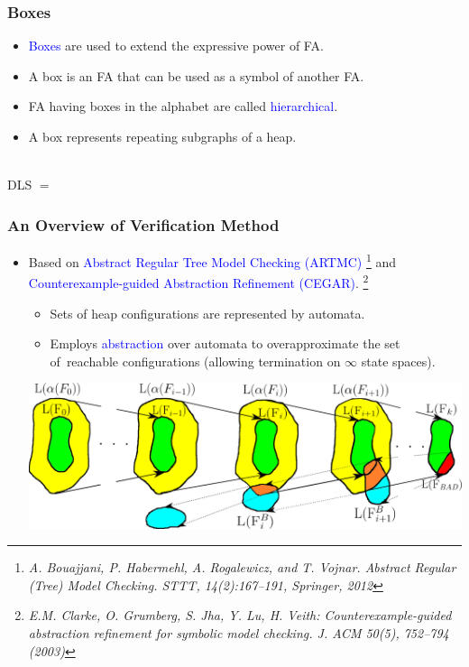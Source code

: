 \documentclass{beamer}
\newcommand{\hlbl}[1]{\textcolor{blue}{#1}}
\begin{document}
 
\begin{frame}
\frametitle{Boxes}

\begin{itemize}
		\item \hlbl{Boxes} are used to extend the expressive power of FA.
		\item A box is an FA that can be used as a symbol of another FA.
		\item FA having boxes in the alphabet are called \hlbl{hierarchical}.
		\item A box represents repeating subgraphs of a heap.
	\end{itemize}
		\vspace{-0.8cm}
		\centering \\
		\vspace{0.7cm}
		\centering DLS $=$ \\
		\vspace{-0.8cm}
		\centering 
\end{frame}


\begin{frame}
  \frametitle{An Overview of Verification Method}
   \begin{itemize}
	   \item Based on \hlbl{Abstract Regular Tree Model Checking (ARTMC)}
		   \footnote{\tiny{\textit{A. Bouajjani, P. Habermehl, A. Rogalewicz, and T. Vojnar. Abstract Regular (Tree) Model Checking. STTT, 14(2):167--191, Springer, 2012}}}
		   and \hlbl{Counterexample-guided Abstraction Refinement (CEGAR)}.
			\footnote{\tiny{\textit{E.M. Clarke, O. Grumberg, S. Jha, Y. Lu, H. Veith: Counterexample-guided abstraction refinement for symbolic model checking. J. ACM 50(5), 752–794 (2003)}}}
		\begin{itemize}
			\item Sets of heap configurations are represented by automata.
			\item Employs \hlbl{abstraction} over automata to overapproximate the set of~reachable configurations (allowing termination on $\infty$ state spaces).
		\end{itemize}
	   \pause
	   \vspace{0.2cm}
	   \includegraphics[scale=0.26]{artmc.png}
  \end{itemize}
\end{frame}
 
\end{document}
